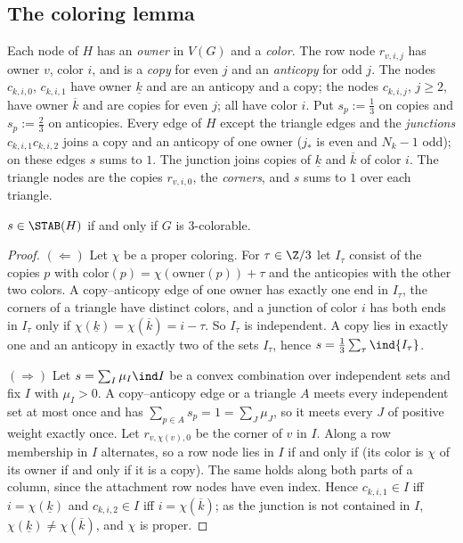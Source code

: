 \subsection{The coloring lemma}\label{sec:coloring}

Each node of $H$ has an \emph{owner} in $V(G)$ and a \emph{color}. The row node $r_{v,i,j}$ has owner $v$, color $i$, and is a \emph{copy} for even $j$ and an \emph{anticopy} for odd $j$. The nodes $c_{k,i,0}$, $c_{k,i,1}$ have owner $\underline k$ and are an anticopy and a copy; the nodes $c_{k,i,j}$, $j\ge2$, have owner $\overline k$ and are copies for even $j$; all have color $i$. Put $s_p:=\frac13$ on copies and $s_p:=\frac23$ on anticopies. Every edge of $H$ except the triangle edges and the \emph{junctions} $c_{k,i,1}c_{k,i,2}$ joins a copy and an anticopy of one owner ($j_*$ is even and $N_k-1$ odd); on these edges $s$ sums to $1$. The junction joins copies of $\underline k$ and $\overline k$ of color $i$. The triangle nodes are the copies $r_{v,i,0}$, the \emph{corners}, and $s$ sums to $1$ over each triangle.

\begin{lemma}[coloring]\label{lem:coloring}
$s\in\STAB(H)$ if and only if $G$ is 3-colorable.
\end{lemma}

\begin{proof}
$(\Leftarrow)$ Let $\chi$ be a proper coloring. For $\tau\in\Z/3$ let $I_\tau$ consist of the copies $p$ with $\mathrm{color}(p)=\chi(\mathrm{owner}(p))+\tau$ and the anticopies with the other two colors. A copy--anticopy edge of one owner has exactly one end in $I_\tau$, the corners of a triangle have distinct colors, and a junction of color $i$ has both ends in $I_\tau$ only if $\chi(\underline k)=\chi(\overline k)=i-\tau$. So $I_\tau$ is independent. A copy lies in exactly one and an anticopy in exactly two of the sets $I_\tau$, hence $s=\frac13\sum_\tau\ind{I_\tau}$.

$(\Rightarrow)$ Let $s=\sum_I\mu_I\ind I$ be a convex combination over independent sets and fix $I$ with $\mu_I>0$. A copy--anticopy edge or a triangle $A$ meets every independent set at most once and has $\sum_{p\in A}s_p=1=\sum_J\mu_J$, so it meets every $J$ of positive weight exactly once. Let $r_{v,\chi(v),0}$ be the corner of $v$ in $I$. Along a row membership in $I$ alternates, so a row node lies in $I$ if and only if (its color is $\chi$ of its owner if and only if it is a copy). The same holds along both parts of a column, since the attachment row nodes have even index. Hence $c_{k,i,1}\in I$ iff $i=\chi(\underline k)$ and $c_{k,i,2}\in I$ iff $i=\chi(\overline k)$; as the junction is not contained in $I$, $\chi(\underline k)\ne\chi(\overline k)$, and $\chi$ is proper.
\end{proof}

